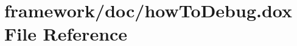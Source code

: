 \hypertarget{how_to_debug_8dox}{}\section{framework/doc/how\+To\+Debug.dox File Reference}
\label{how_to_debug_8dox}
